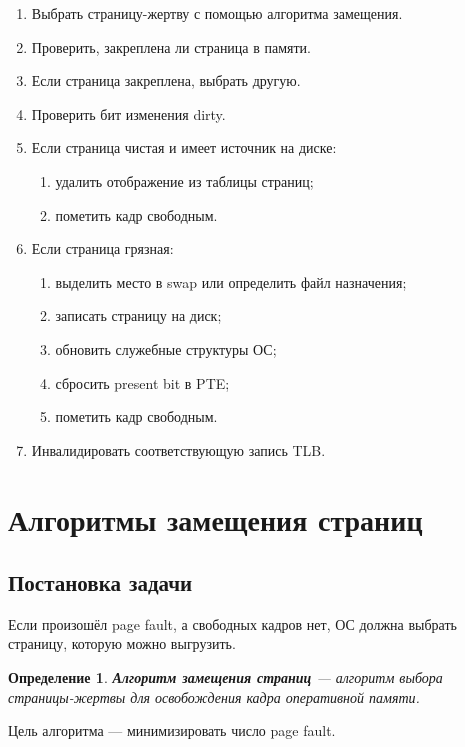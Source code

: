 \documentclass[a4paper,12pt]{article}
\newtheorem{definition}{Определение}
\begin{document}
\begin{enumerate}
    \item Выбрать страницу-жертву с помощью алгоритма замещения.
    \item Проверить, закреплена ли страница в памяти.
    \item Если страница закреплена, выбрать другую.
    \item Проверить бит изменения dirty.
    \item Если страница чистая и имеет источник на диске:
    \begin{enumerate}
        \item удалить отображение из таблицы страниц;
        \item пометить кадр свободным.
    \end{enumerate}
    \item Если страница грязная:
    \begin{enumerate}
        \item выделить место в swap или определить файл назначения;
        \item записать страницу на диск;
        \item обновить служебные структуры ОС;
        \item сбросить present bit в PTE;
        \item пометить кадр свободным.
    \end{enumerate}
    \item Инвалидировать соответствующую запись TLB.
\end{enumerate}

\section{Алгоритмы замещения страниц}

\subsection{Постановка задачи}

Если произошёл page fault, а свободных кадров нет, ОС должна выбрать страницу, которую можно выгрузить.

\begin{definition}
\textbf{Алгоритм замещения страниц} --- алгоритм выбора страницы-жертвы для освобождения кадра оперативной памяти.
\end{definition}

Цель алгоритма --- минимизировать число page fault.
\end{document}
